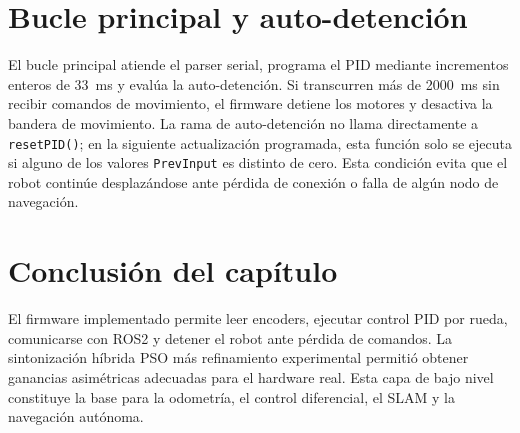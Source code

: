 \section{Bucle principal y auto-detención}
\label{sec:bucle_principal}

El bucle principal atiende el parser serial, programa el PID mediante incrementos enteros de 33~ms y evalúa la auto-detención. Si transcurren más de 2000~ms sin recibir comandos de movimiento, el firmware detiene los motores y desactiva la bandera de movimiento. La rama de auto-detención no llama directamente a \texttt{resetPID()}; en la siguiente actualización programada, esta función solo se ejecuta si alguno de los valores \texttt{PrevInput} es distinto de cero. Esta condición evita que el robot continúe desplazándose ante pérdida de conexión o falla de algún nodo de navegación.

\section*{Conclusión del capítulo}

El firmware implementado permite leer encoders, ejecutar control PID por rueda, comunicarse con \gls{ROS2} y detener el robot ante pérdida de comandos. La sintonización híbrida PSO más refinamiento experimental permitió obtener ganancias asimétricas adecuadas para el hardware real. Esta capa de bajo nivel constituye la base para la odometría, el control diferencial, el SLAM y la navegación autónoma.